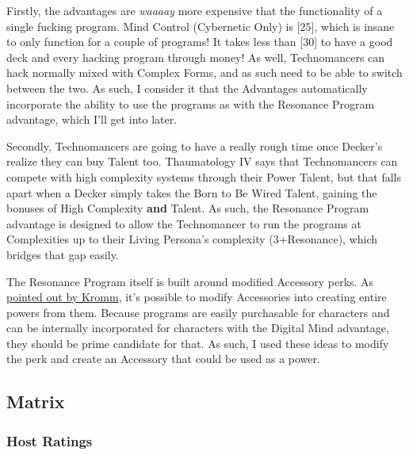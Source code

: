 \begin{multicols*}{2}
	Firstly, the advantages are \textit{waaaay} more expensive that the functionality of a single fucking program. Mind Control (Cybernetic Only) is [25], which is insane to only function for a couple of programs! It takes less than [30] to have a good deck and every hacking program through money! As well, Technomancers can hack normally mixed with Complex Forms, and as such need to be able to switch between the two. As such, I consider it that the Advantages automatically incorporate the ability to use the programs as with the Resonance Program advantage, which I'll get into later.
	
	Secondly, Technomancers are going to have a really rough time once Decker's realize they can buy Talent too. Thaumatology IV says that Technomancers can compete with high complexity systems through their Power Talent, but that falls apart when a Decker simply takes the Born to Be Wired Talent, gaining the bonuses of High Complexity \textbf{and} Talent. As such, the Resonance Program advantage is designed to allow the Technomancer to run the programs at Complexities up to their Living Persona's complexity (3+Resonance), which bridges that gap easily.
	
	The Resonance Program itself is built around modified Accessory perks. As \textcolor{NavyBlue}{\href{http://forums.sjgames.com/showpost.php?p=561052&postcount=8}{pointed out by Kromm}}, it's possible to modify Accessories into creating entire powers from them. Because programs are easily purchasable for characters and can be internally incorporated for characters with the Digital Mind advantage, they should be prime candidate for that. As such, I used these ideas to modify the perk and create an Accessory that could be used as a power.	
	
	\subsection{Matrix}
	
	\subsubsection{Host Ratings} \label{Host Ratings BTS}
	

\end{multicols*}
